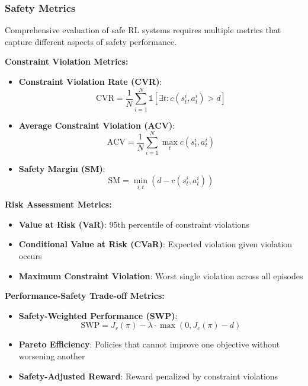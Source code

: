 \documentclass[12pt]{article}
\begin{document}
{{{{\subsubsection{Safety Metrics}

Comprehensive evaluation of safe RL systems requires multiple metrics that capture different aspects of safety performance.

\textbf{Constraint Violation Metrics:}
\begin{itemize}
\item \textbf{Constraint Violation Rate (CVR)}:
\begin{equation}
\text{CVR} = \frac{1}{N} \sum_{i=1}^{N} \mathbb{1}[\exists t: c(s_t^i, a_t^i) > d]
\end{equation}

\item \textbf{Average Constraint Violation (ACV)}:
\begin{equation}
\text{ACV} = \frac{1}{N} \sum_{i=1}^{N} \max_t c(s_t^i, a_t^i)
\end{equation}

\item \textbf{Safety Margin (SM)}:
\begin{equation}
\text{SM} = \min_{i,t} (d - c(s_t^i, a_t^i))
\end{equation}
\end{itemize}

\textbf{Risk Assessment Metrics:}
\begin{itemize}
\item \textbf{Value at Risk (VaR)}: 95th percentile of constraint violations
\item \textbf{Conditional Value at Risk (CVaR)}: Expected violation given violation occurs
\item \textbf{Maximum Constraint Violation}: Worst single violation across all episodes
\end{itemize}

\textbf{Performance-Safety Trade-off Metrics:}
\begin{itemize}
\item \textbf{Safety-Weighted Performance (SWP)}:
\begin{equation}
\text{SWP} = J_r(\pi) - \lambda \cdot \max(0, J_c(\pi) - d)
\end{equation}

\item \textbf{Pareto Efficiency}: Policies that cannot improve one objective without worsening another
\item \textbf{Safety-Adjusted Reward}: Reward penalized by constraint violations
\end{itemize}

}}}}
\end{document}
